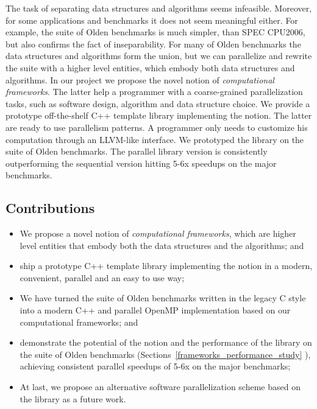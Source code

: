 \quad The task of separating data structures and algorithms seems infeasible. Moreover, for some applications and benchmarks it does not seem meaningful either. For example, the suite of Olden benchmarks is much simpler, than SPEC CPU2006, but also confirms the fact of inseparability. For many of Olden benchmarks the data structures and algorithms form the union, but we can parallelize and rewrite the suite with a higher level entities, which embody both data structures and algorithms. In our project we propose the novel notion of \textit{computational frameworks}. The latter help a programmer with a coarse-grained parallelization tasks, such as software design, algorithm and data structure choice. We provide a prototype off-the-shelf C++ template library implementing the notion. The latter are ready to use parallelism patterns. A programmer only needs to customize his computation through an LLVM-like interface. We prototyped the library on the suite of Olden benchmarks. The parallel library version is consistently outperforming the sequential version hitting 5-6x speedups on the major benchmarks.\newline\null
\subsection{Contributions}
\begin{itemize}[style=unboxed,leftmargin=0cm]
\itemsep0em
\renewcommand\labelitemi{$\vartriangleright$}
\renewcommand\labelitemii{$\bullet$}
\item We propose a novel notion of \textit{computational frameworks}, which are higher level entities that embody both the data structures and the algorithms; and
\item ship a prototype C++ template library implementing the notion in a modern, convenient, parallel and an easy to use way;
\item We have turned the suite of Olden benchmarks written in the legacy C style into a modern C++ and parallel OpenMP implementation based on our computational frameworks; and
\item demonstrate the potential of the notion and the performance of the library on the suite of Olden benchmarks (Sections~\ref{frameworks_performance_study} ), achieving consistent parallel speedups of 5-6x on the major benchmarks;
\item At last, we propose an alternative software parallelization scheme based on the library as a future work.
\end{itemize}




